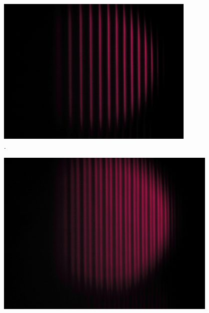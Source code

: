 \begin{figure}[h!]
  \centering
  \includegraphics[width=0.85\textwidth]{data/temp/rot_ohneB_0_aufgehellt.JPG}
  \caption{\cite{insert Beschriftung 3}.}
  \label{fig:rotOhneB0_aufgehellt}
\end{figure}
\begin{figure}[h!]
  \centering
  \includegraphics[width=0.95\textwidth]{data/temp/rot_mitB_0_aufgehellt.JPG}
  \caption{\cite{insert Beschriftung 4}}
  \label{fig:rotMitB0_aufgehellt}
\end{figure}


